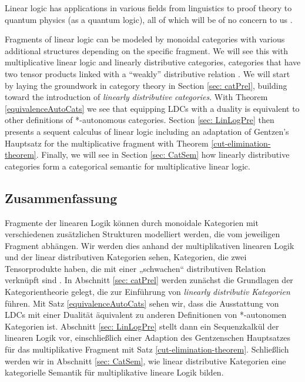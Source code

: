 \documentclass[DIN, pagenumber=false, fontsize=11pt, parskip=half, colorinlistoftodos, svgnames]{scrartcl}
\newcommand{\urgentnote}[2][]{\todo[color=red, #1]{#2}}
\begin{document}
	Linear logic has applications in various fields from linguistics to proof theory to quantum physics (as a quantum logic), all of which will be of no concern to us \cite{depaiva_et_al:DagSemRep.248, physicsApplication}.
	
	Fragments of linear logic can be modeled by monoidal categories with various additional structures depending on the specific fragment.
	We will see this with multiplicative linear logic and linearly distributive categories, categories that have two tensor products linked with a “weakly” distributive relation \cite{cockett&seely97}. 
	We will start by laying the groundwork in category theory in Section \ref{sec: catPrel}, building toward the introduction of \emph{linearly} \emph{distributive} \emph{categories}. 
	With Theorem \ref{equivalenceAutoCats} we see that equipping LDCs with a duality is equivalent to other definitions of *-autonomous categories. 
	Section \ref{sec: LinLogPre} then presents a sequent calculus of linear logic including an adaptation of Gentzen's Hauptsatz for the multiplicative fragment with Theorem \ref{cut-elimination-theorem}. 
	Finally, we will see in Section \ref{sec: CatSem} how linearly distributive categories form a categorical semantic for multiplicative linear logic. 
	
	
	
	
	\subsection{Zusammenfassung}
	Fragmente der linearen Logik können durch monoidale Kategorien mit verschiedenen zusätzlichen Strukturen modelliert werden, die vom jeweiligen Fragment abhängen.
	Wir werden dies anhand der multiplikativen linearen Logik und der linear distributiven Kategorien sehen, Kategorien, die zwei Tensorprodukte haben, die mit einer „schwachen“ distributiven Relation verknüpft sind \cite{cockett&seely97}. 
	In Abschnitt \ref{sec: catPrel} werden zunächst die Grundlagen der Kategorientheorie gelegt, die zur Einführung von \emph{linearly} \emph{distributiv} \emph{Kategorien} führen. 
	Mit Satz \ref{equivalenceAutoCats} sehen wir, dass die Ausstattung von LDCs mit einer Dualität äquivalent zu anderen Definitionen von *-autonomen Kategorien ist. 
	Abschnitt \ref{sec: LinLogPre} stellt dann ein Sequenzkalkül der linearen Logik vor, einschließlich einer Adaption des Gentzenschen Hauptsatzes für das multiplikative Fragment mit Satz \ref{cut-elimination-theorem}. 
	Schließlich werden wir in Abschnitt \ref{sec: CatSem}, wie linear distributive Kategorien eine kategorielle Semantik für multiplikative lineare Logik bilden. 
	
\end{document}
